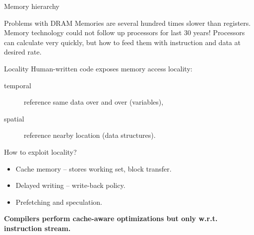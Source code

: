 \documentclass[8pt]{beamer}
\begin{document}
\begin{frame}{Memory hierarchy}
  \begin{alertblock}{Problems with DRAM}
    Memories are several hundred times slower than registers. Memory technology
    could not follow up processors for last 30 years! Processors can calculate
    very quickly, but how to feed them with instruction and data at desired
    rate.
  \end{alertblock}

  \begin{block}{Locality}
    Human-written code exposes memory access locality:
    \begin{description}
      \item[temporal] reference same data over and over (variables),
      \item[spatial] reference nearby location (data structures).
    \end{description}
    \vspace{1em}
    How to exploit locality?
    \begin{itemize}
      \item Cache memory -- stores working set, block transfer.
      \item Delayed writing -- write-back policy.
      \item Prefetching and speculation.
    \end{itemize}
    \vspace{1em}
    \textbf{Compilers perform cache-aware optimizations but only w.r.t.
      instruction stream.}
  \end{block}
\end{frame}
\end{document}
